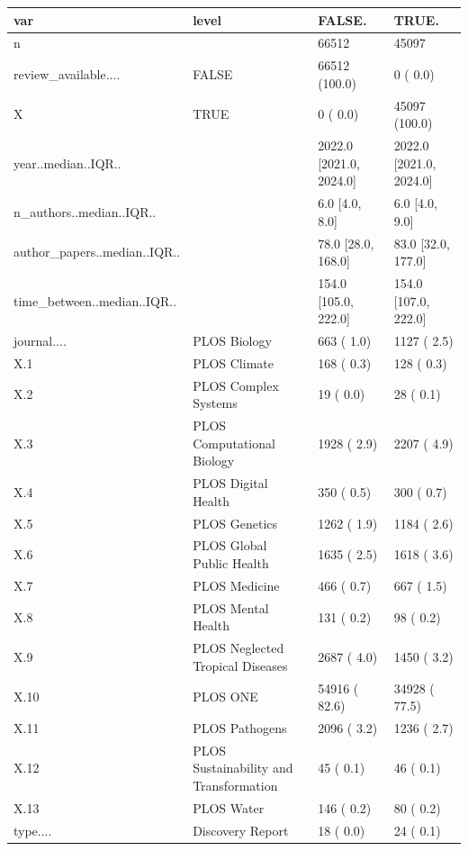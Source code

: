 \begin{table}[ht]
\centering
\begin{tabular}{llll}
 var & level & FALSE. & TRUE. \\ 
  \hline
n &  &  66512 &  45097 \\ 
  review\_available.... & FALSE &  66512 (100.0)  &      0 (  0.0)  \\ 
  X & TRUE &      0 (  0.0)  &  45097 (100.0)  \\ 
  year..median..IQR.. &  & 2022.0 [2021.0, 2024.0] & 2022.0 [2021.0, 2024.0] \\ 
  n\_authors..median..IQR.. &  &    6.0 [4.0, 8.0] &    6.0 [4.0, 9.0] \\ 
  author\_papers..median..IQR.. &  &   78.0 [28.0, 168.0] &   83.0 [32.0, 177.0] \\ 
  time\_between..median..IQR.. &  &  154.0 [105.0, 222.0] &  154.0 [107.0, 222.0] \\ 
  journal.... & PLOS Biology &    663 (  1.0)  &   1127 (  2.5)  \\ 
  X.1 & PLOS Climate &    168 (  0.3)  &    128 (  0.3)  \\ 
  X.2 & PLOS Complex Systems &     19 (  0.0)  &     28 (  0.1)  \\ 
  X.3 & PLOS Computational Biology &   1928 (  2.9)  &   2207 (  4.9)  \\ 
  X.4 & PLOS Digital Health &    350 (  0.5)  &    300 (  0.7)  \\ 
  X.5 & PLOS Genetics &   1262 (  1.9)  &   1184 (  2.6)  \\ 
  X.6 & PLOS Global Public Health &   1635 (  2.5)  &   1618 (  3.6)  \\ 
  X.7 & PLOS Medicine &    466 (  0.7)  &    667 (  1.5)  \\ 
  X.8 & PLOS Mental Health &    131 (  0.2)  &     98 (  0.2)  \\ 
  X.9 & PLOS Neglected Tropical Diseases &   2687 (  4.0)  &   1450 (  3.2)  \\ 
  X.10 & PLOS ONE &  54916 ( 82.6)  &  34928 ( 77.5)  \\ 
  X.11 & PLOS Pathogens &   2096 (  3.2)  &   1236 (  2.7)  \\ 
  X.12 & PLOS Sustainability and Transformation &     45 (  0.1)  &     46 (  0.1)  \\ 
  X.13 & PLOS Water &    146 (  0.2)  &     80 (  0.2)  \\ 
  type.... & Discovery Report &     18 (  0.0)  &     24 (  0.1)  \\ 

\end{tabular}
\end{table}
